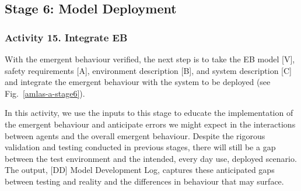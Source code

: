 \documentclass[runningheads]{llncs}
\begin{document}
\subsection{Stage 6: Model Deployment} \label{framework-stage6}

\subsubsection*{Activity 15. Integrate EB}

With the emergent behaviour verified, the next step is to take the EB model [V], safety requirements [A], environment description [B], and system description [C] and integrate the emergent behaviour with the system to be deployed (see Fig.~\ref{amlas-a-stage6}). 

In this activity, we use the inputs to this stage to educate the implementation of the emergent behaviour and anticipate errors we might expect in the interactions between agents and the overall emergent behaviour. Despite the rigorous validation and testing conducted in previous stages, there will still be a gap between the test environment and the intended, every day use, deployed scenario. The output, [DD] Model Development Log, captures these anticipated gaps between testing and reality and the differences in behaviour that may surface. 
\end{document}
